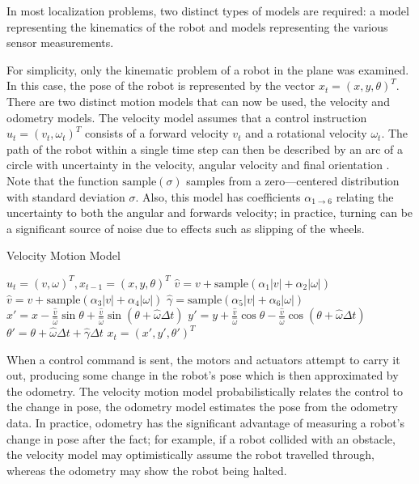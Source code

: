 \documentclass[english]{article}
\begin{document}
In most localization problems, two distinct types of models are required: a model representing the kinematics of the robot and models representing the various sensor measurements. 

For simplicity, only the kinematic problem of a robot in the plane was examined. In this case, the pose of the robot is represented by the vector $x_t = (x,y,\theta)^T$. There are two distinct motion models that can now be used, the velocity and odometry models.
The velocity model assumes that a control instruction $u_t = (v_t, \omega_t)^T$ consists of a forward velocity $v_t$ and a rotational velocity $\omega_t$. The path of the robot within a single time step can then be described by an arc of a circle with uncertainty in the  velocity, angular velocity and final orientation \cite{probrob}. Note that the function $\textrm{sample}(\sigma)$ samples from a zero---centered distribution with standard deviation $\sigma$. Also, this model has coefficients $\alpha_{1\rightarrow 6}$ relating the uncertainty to both the angular and forwards velocity; in practice, turning can be a significant source of noise due to effects such as slipping of the wheels.

\begin{algorithm}
\caption{Velocity Motion Model}
\label{alg:velocity_model}
\begin{algorithmic}
	\REQUIRE $u_t = (v, \omega)^T, x_{t-1} = (x, y, \theta)^T $
        \STATE $\hat{v} = v + \textrm{sample}(\alpha_1|v| + \alpha_2|\omega|)$
        \STATE $\hat{v} = v + \textrm{sample}(\alpha_3|v| + \alpha_4|\omega|)$
        \STATE $\hat{\gamma} = \textrm{sample}(\alpha_5|v| + \alpha_6|\omega|)$
        \STATE $x' = x - \frac{\hat{v}}{\hat{\omega}}\sin{\theta} + \frac{\hat{v}}{\hat{\omega}}\sin{(\theta + \hat{\omega} \Delta t)}$
        \STATE $y' = y + \frac{\hat{v}}{\hat{\omega}}\cos{\theta} - \frac{\hat{v}}{\hat{\omega}}\cos{(\theta + \hat{\omega} \Delta t)}$
        \STATE $\theta' = \theta + \hat{\omega}\Delta t + \hat{\gamma}\Delta t$
        \RETURN $x_t = (x', y', \theta')^T$
\end{algorithmic}
\end{algorithm}


When a control command is sent, the motors and actuators attempt to carry it out, producing some change in the robot's pose which is then approximated by the odometry. The velocity motion model probabilistically relates the control to the change in pose, the odometry model estimates the pose from the odometry data. In practice, odometry has the significant advantage of measuring a robot's change in pose after the fact; for example, if a robot collided with an obstacle, the velocity model may optimistically assume the robot travelled through, whereas the odometry may show the robot being halted.
\end{document}

